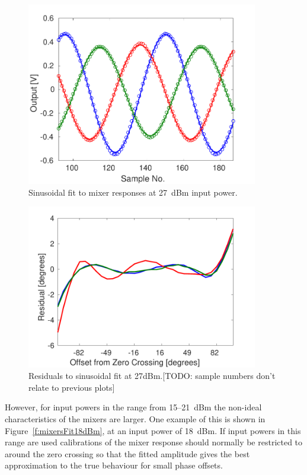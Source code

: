 \begin{figure}
  \centering
  \includegraphics[width=0.9\textwidth]{Figures/phaseMons/mixersFit27dBm}
  \caption{Sinusoidal fit to mixer responses at 27~dBm input power.}
  \label{f:mixersFit27dBm}
\end{figure}

\begin{figure}
  \centering
  \includegraphics[width=0.9\textwidth]{Figures/phaseMons/mixersFitResid27dBm}
  \caption{Residuals to sinusoidal fit at 27dBm.[TODO: sample numbers don't relate to previous plots]}
  \label{f:mixersFitResid27dBm}
\end{figure}

However, for input powers in the range from 15--21~dBm the non-ideal characteristics of the mixers are larger. One example of this is shown in Figure~\ref{f:mixersFit18dBm}, at an input power of 18~dBm. If input powers in this range are used calibrations of the mixer response should normally be restricted to around the zero crossing so that the fitted amplitude gives the best approximation to the true behaviour for small phase offsets. 

